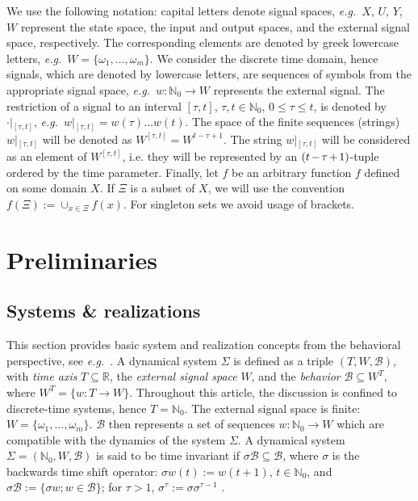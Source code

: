 \documentclass[a4paper, 10pt, conference]{ieeeconf}
\newcommand{\eg}{\emph{e.g.}~}
\newcommand{\hspu}{\hspace{-1pt}}
\newcommand{\nato}{{\mathbb{N}_0}}
\newcommand{\taut}{{_{[\tau,t]}}}
\newcommand{\tautn}{{{[\tau,t]}}}
\begin{document}
We use the following notation: capital letters denote signal spaces, \eg $X$, $U$, $Y$, $W$ represent the state space,
the input and output spaces, and the external signal space, respectively. The corresponding elements are denoted by greek lowercase letters, \eg $W=\{\omega_1,\ldots,\omega_m\}$. We consider the discrete time domain, hence signals, which
are denoted by lowercase letters, are sequences of symbols from the appropriate signal space, \eg $w : \nato\to W$ represents the external signal. The restriction of a signal to an interval $[\tau,t]$, $\tau,t\in\nato$, $0\leq \tau\leq t$, is denoted by $\cdot|\taut$, \eg $w|\taut=  w(\tau)\ldots w(t)$. The space of the finite sequences (strings) $w|\taut$ will be denoted as $W^\tautn= W^{t-\tau+1}$. The string $w|\taut$ will be considered as an element of $W^\tautn$, i.e. they will be represented by an $(t\hspu-\hspu\tau\hspu+\hspu 1)$-tu\-ple ordered by the time parameter. Finally, let $f$ be an arbitrary function $f$ defined on some domain $X$. If $\Xi$ is a subset of $X$, we will use the convention $f(\Xi):= \cup_{x\in \Xi} f(x)$. For singleton sets we avoid usage of brackets. 






















\section{Preliminaries}
\label{sec:monolithic}


\subsection{Systems \& realizations}
\label{sec:monolithic_dynamic}
This section provides basic system and realization concepts from the behavioral perspective, see \eg \cite{Wi91}. A dynamical system $\Sigma$ is defined as a triple $(T,W,\mathcal{B})$, with \emph{time axis} $T\subseteq \mathbb{R}$, the \emph{external signal space} $W$, and the \emph{behavior} $\mathcal{B}\subseteq W^T$, where $W^T=\{w: T\to W\}$.
Throughout this article, the discussion is confined to discrete-time systems, hence $T=\mathbb{N}_0$. The external signal space is finite: $W=\{\omega_1,\ldots,\omega_m\}$. $\mathcal{B}$ then represents a set of sequences $w:\mathbb{N}_0\rightarrow W$ which are compatible with the dynamics of the system $\Sigma$. A dynamical system $\Sigma=(\mathbb{N}_0,W,\mathcal{B})$ is said to be {time invariant} if $\sigma\mathcal{B}\subseteq \mathcal{B}$, where $\sigma$ is the backwards time shift operator: $\sigma w(t):=w({t+1})$, $t \in \mathbb{N}_0$, and $\sigma\mathcal{B}:=\{\sigma w; w\in \mathcal{B}\}$; for $\tau>1$, $\sigma^\tau:=\sigma \sigma^{\tau-1}$ . 
\end{document}
